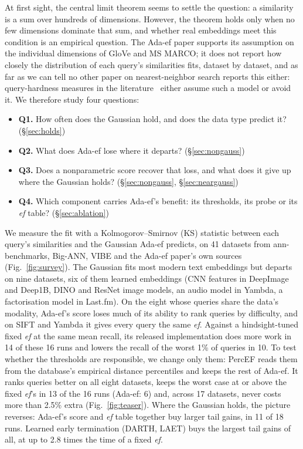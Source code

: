 \documentclass[sigconf,anonymous]{acmart}
\newcommand{\ef}{\textit{ef}}
\begin{document}
At first sight, the central limit theorem seems to settle the question: a similarity is a sum over
hundreds of dimensions. However, the theorem holds only when no few dimensions dominate that sum,
and whether real embeddings meet this condition is an empirical question. The Ada-ef paper supports
its assumption on the individual dimensions of GloVe and MS MARCO; it does not report how closely the
distribution of each query's similarities fits, dataset by dataset, and as far as we can tell no
other paper on nearest-neighbor search reports this either: query-hardness measures in the
literature~\cite{he2012difficulty,aumuller2019lid,wang2024steiner} either assume such a model or
avoid it. We therefore study four questions:
\begin{itemize}
\item \textbf{Q1.} How often does the Gaussian hold, and does the data type predict it?
  (\S\ref{sec:holds})
\item \textbf{Q2.} What does Ada-ef lose where it departs? (\S\ref{sec:nongauss})
\item \textbf{Q3.} Does a nonparametric score recover that loss, and what does it give up where the
  Gaussian holds? (\S\ref{sec:nongauss}, \S\ref{sec:neargauss})
\item \textbf{Q4.} Which component carries Ada-ef's benefit: its thresholds, its probe or its \ef{}
  table? (\S\ref{sec:ablation})
\end{itemize}

We measure the fit with a Kolmogorov--Smirnov (KS) statistic between each query's similarities and
the Gaussian Ada-ef predicts, on 41 datasets from ann-benchmarks, Big-ANN, VIBE and the Ada-ef
paper's own sources (Fig.~\ref{fig:survey}). The Gaussian fits most modern text embeddings but
departs on nine datasets, six of them learned embeddings (CNN features in DeepImage and Deep1B, DINO
and ResNet image models, an audio model in Yambda, a factorisation model in Last.fm). On the eight
whose queries share the data's modality, Ada-ef's score loses much of its ability to rank queries
by difficulty, and on SIFT and Yambda it gives every query the same \ef{}. Against a hindsight-tuned
fixed \ef{} at the same mean recall, its released implementation does more work in 14 of these 16
runs and lowers the recall of the worst 1\% of queries in 10. To test whether the thresholds are
responsible, we change only them: PercEF reads them from the database's empirical distance
percentiles and keeps the rest of Ada-ef. It ranks queries better on all eight datasets, keeps the
worst case at or above the fixed \ef{}'s in 13 of the 16 runs (Ada-ef: 6) and, across 17 datasets,
never costs more than 2.5\% extra (Fig.~\ref{fig:teaser}). Where the Gaussian holds, the picture
reverses: Ada-ef's score and \ef{} table together buy larger tail gains, in 11 of 18 runs.
Learned early termination (DARTH, LAET) buys the largest tail gains of all, at up to 2.8 times the
time of a fixed \ef{}.
\end{document}
